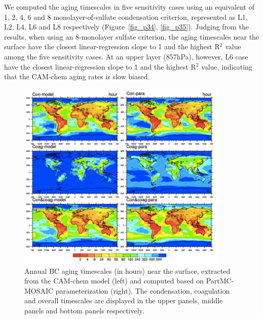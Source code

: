 \documentclass[12pt, fullpage]{uiucthesis2009}
\begin{document}
	We computed the aging timescales in five sensitivity cases using an equivalent of 1, 2, 4, 6 and 8 monolayer-of-sulfate condensation criterion, represented as L1, L2, L4, L6 and L8 respectively (Figure~\ref{fig_p34}, \ref{fig_p35}). Judging from the results, when using an 8-monolayer sulfate criterion, the aging timescales near the surface have the closest linear-regression slope to 1 and the highest R$^2$ value among the five sensitivity cases. At an upper layer (857hPa), however, L6 case have the closest linear-regression slope to 1 and the highest R$^2$ value, indicating that the CAM-chem aging rates is slow biased. 

	
	\begin{figure}[h] 
		\begin{center}
			\includegraphics[width = 0.9\textwidth]{Figure32}
			\caption[Annual BC aging timescales (in hours) near the surface, extracted from the CAM-chem model (left) and computed based on PartMC-MOSAIC parameterization (right). The condensation, coagulation and overall timescales are displayed in the upper panels, middle panels and bottom panels respectively]{\label{fig_p32} Annual BC aging timescales (in hours) near the surface, extracted from the CAM-chem model (left) and computed based on PartMC-MOSAIC parameterization (right). The condensation, coagulation and overall timescales are displayed in the upper panels, middle panels and bottom panels respectively.}
		\end{center}
	\end{figure}
\end{document}
